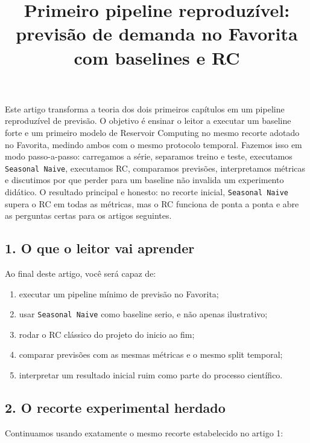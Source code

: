 \documentclass[12pt]{article}
\title{Primeiro pipeline reproduzível: previsão de demanda no Favorita com baselines e RC}
\author{}
\providecommand{\tightlist}{%
          \setlength{\itemsep}{0pt}\setlength{\parskip}{0pt}}
\begin{document}
        \maketitle

        \begin{resumo}
        Este artigo transforma a teoria dos dois primeiros capítulos em um pipeline reproduzível de previsão. O objetivo é ensinar o leitor a executar um baseline forte e um primeiro modelo de Reservoir Computing no mesmo recorte adotado no Favorita, medindo ambos com o mesmo protocolo temporal. Fazemos isso em modo passo-a-passo: carregamos a série, separamos treino e teste, executamos \texttt{Seasonal\ Naive}, executamos RC, comparamos previsões, interpretamos métricas e discutimos por que perder para um baseline não invalida um experimento didático. O resultado principal e honesto: no recorte inicial, \texttt{Seasonal\ Naive} supera o RC em todas as métricas, mas o RC funciona de ponta a ponta e abre as perguntas certas para os artigos seguintes.
        \end{resumo}

        \subsection{1. O que o leitor vai aprender}\label{1-o-que-o-leitor-vai-aprender}

Ao final deste artigo, você será capaz de:

\begin{enumerate}
\def\labelenumi{\arabic{enumi}.}
\tightlist
\item
  executar um pipeline mínimo de previsão no Favorita;
\item
  usar \texttt{Seasonal\ Naive} como baseline serio, e não apenas ilustrativo;
\item
  rodar o RC clássico do projeto do inicio ao fim;
\item
  comparar previsões com as mesmas métricas e o mesmo split temporal;
\item
  interpretar um resultado inicial ruim como parte do processo científico.
\end{enumerate}

\subsection{2. O recorte experimental herdado}\label{2-o-recorte-experimental-herdado}

Continuamos usando exatamente o mesmo recorte estabelecido no artigo 1:
\end{document}

